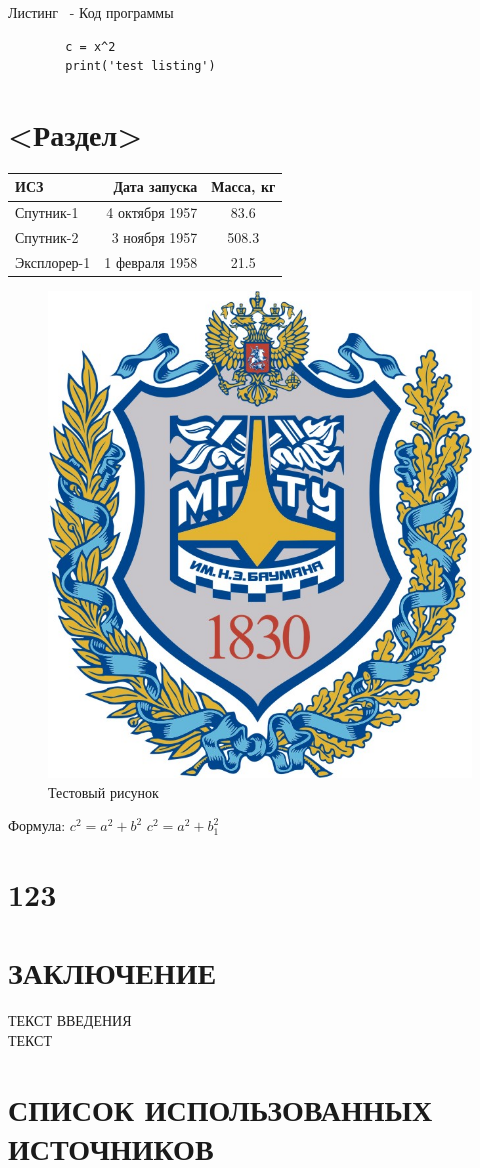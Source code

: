 \documentclass[12pt, left=25mm,right=10mm,top=15mm,bottom=15mm]{templateReportBMSTU}
\begin{document}
	Листинг \thenumberlisting \ - Код программы
	\begin{lstlisting}
		c = x^2
		print('test listing')
	\end{lstlisting}
	\pagebreak

	\section{<Раздел>}  \label{section1}

	\begin{tabular}{ | p{100pt} | r | c | }
		\hline
		ИСЗ & Дата запуска & Масса, кг  \\ \hline
		Спутник-1 & 4 октября 1957 & 83.6 \\
		Спутник-2 & 3 ноября 1957 & 508.3 \\
		Эксплорер-1 & 1 февраля 1958 & 21.5 \\
		\hline
	\end{tabular}

	\begin{figure}[h]
		\centering
		\includegraphics[width=0.5\linewidth]{1.png}
		\caption{Тестовый рисунок}
		\label{fig:mpr}
	\end{figure}
	
	Формула: $c^{2}=a^{2}+b^{2}$
	\begin{math}
		c^2 = a^2 + b_1^2
	\end{math}
		\pagebreak
	
	\section{123}

	\section*{ЗАКЛЮЧЕНИЕ}
		ТЕКСТ ВВЕДЕНИЯ
		\\ ТЕКСТ
		\pagebreak

	\section*{СПИСОК ИСПОЛЬЗОВАННЫХ ИСТОЧНИКОВ}

		\pagebreak
\end{document}
